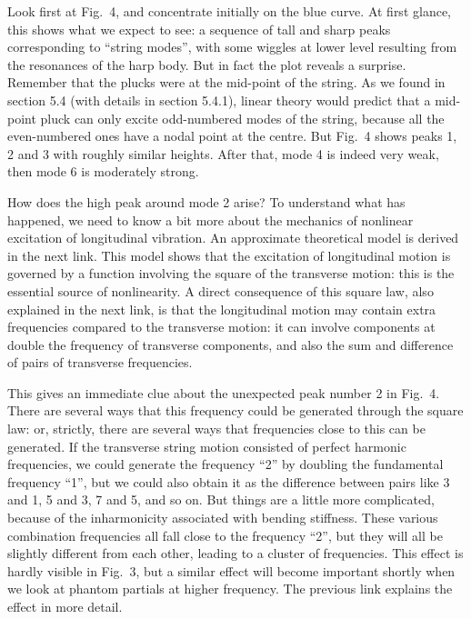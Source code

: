   Look first at Fig.\ 4, and concentrate initially on the blue curve. At first 
  glance, this shows what we expect to see: a sequence of tall and sharp peaks 
  corresponding to “string modes”, with some wiggles at lower level resulting 
  from the resonances of the harp body. But in fact the plot reveals a 
  surprise. Remember that the plucks were at the mid-point of the string. As we 
  found in section 5.4 (with details in section 5.4.1), linear theory would 
  predict that a mid-point pluck can only excite odd-numbered modes of the 
  string, because all the even-numbered ones have a nodal point at the centre. 
  But Fig.\ 4 shows peaks 1, 2 and 3 with roughly similar heights. After that, 
  mode 4 is indeed very weak, then mode 6 is moderately strong. 

  How does the high peak around mode 2 arise? To understand what has happened, 
  we need to know a bit more about the mechanics of nonlinear excitation of 
  longitudinal vibration. An approximate theoretical model is derived in the 
  next link. This model shows that the excitation of longitudinal motion is 
  governed by a function involving the square of the transverse motion: this is 
  the essential source of nonlinearity. A direct consequence of this square 
  law, also explained in the next link, is that the longitudinal motion may 
  contain extra frequencies compared to the transverse motion: it can involve 
  components at double the frequency of transverse components, and also the sum 
  and difference of pairs of transverse frequencies. 

  This gives an immediate clue about the unexpected peak number 2 in Fig.\ 4. 
  There are several ways that this frequency could be generated through the 
  square law: or, strictly, there are several ways that frequencies close to 
  this can be generated. If the transverse string motion consisted of perfect 
  harmonic frequencies, we could generate the frequency ``2'' by doubling the 
  fundamental frequency ``1'', but we could also obtain it as the difference 
  between pairs like 3 and 1, 5 and 3, 7 and 5, and so on. But things are a 
  little more complicated, because of the inharmonicity associated with bending 
  stiffness. These various combination frequencies all fall close to the 
  frequency ``2'', but they will all be slightly different from each other, 
  leading to a cluster of frequencies. This effect is hardly visible in Fig.\ 
  3, but a similar effect will become important shortly when we look at phantom 
  partials at higher frequency. The previous link explains the effect in more 
  detail. 

